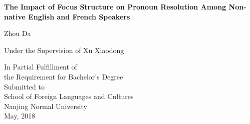\begin{titlepage}
\thispagestyle{empty}
\centering
\vspace*{3em}
\linespread{2}\selectfont
{\LARGE\bfseries 
The Impact of Focus Structure on Pronoun Resolution Among Non-native English and French Speakers}

\vspace{5em}
\linespread{1}\selectfont
\LARGE
Zhou Da

\bigskip
\Large
Under the Supervision of Xu Xiaodong

\vspace{5em}
\linespread{1.2}\selectfont
In Partial Fulfillment of \\
the Requirement for Bachelor's Degree\\
Submitted to\\
School of Foreign Languages and Cultures\\
Nanjing Normal University\\

\vspace{5em}
May, 2018

\end{titlepage}
